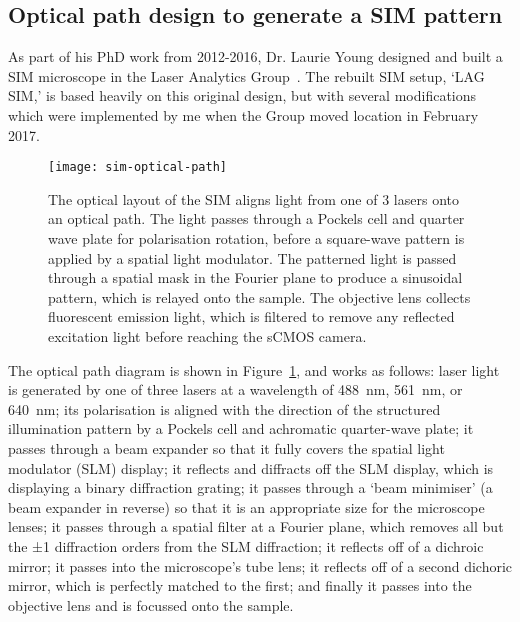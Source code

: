 \subsection{Optical path design to generate a SIM pattern} \label{sec:lagsim-path}
As part of his PhD work from 2012-2016, Dr. Laurie Young designed and built a SIM microscope in the Laser Analytics Group~\cite{young2016guide}. 
The rebuilt SIM setup, `LAG SIM,' is based heavily on this original design, but with several modifications which were implemented by me when the Group moved location in February 2017. 

\begin{figure}[p]
\centering
\texttt{[image: sim-optical-path]}
\caption[LAG SIM: Optics pattern laser light with a SIM pattern and apply polarisation rotation for optical sectioning and resolution enhancement]{The optical layout of the SIM aligns light from one of 3 lasers onto an optical path. The light passes through a Pockels cell and quarter wave plate for polarisation rotation, before a square-wave pattern is applied by a spatial light modulator. The patterned light is passed through a spatial mask in the Fourier plane to produce a sinusoidal pattern, which is relayed onto the sample. The objective lens collects fluorescent emission light,  which is filtered to remove any reflected excitation light before reaching the sCMOS camera.}
\label{fig:SIMpath}
\end{figure}

The optical path diagram is shown in Figure~\ref{fig:SIMpath}, and works as follows: laser light is generated by one of three lasers at a wavelength of \SI{488}{\nano\metre}, \SI{561}{\nano\metre}, or \SI{640}{\nano\metre}; its polarisation is aligned with the direction of the structured illumination pattern by a Pockels cell and achromatic quarter-wave plate; it passes through a beam expander so that it fully covers the spatial light modulator (SLM) display; it reflects and diffracts off the SLM display, which is displaying a binary diffraction grating; it passes through a `beam minimiser' (a beam expander in reverse) so that it is an appropriate size for the microscope lenses; it passes through a spatial filter at a Fourier plane, which removes all but the ±1 diffraction orders from the SLM diffraction; it reflects off of a dichroic mirror; it passes into the microscope's tube lens; it reflects off of a second dichoric mirror, which is perfectly matched to the first; and finally it passes into the objective lens and is focussed onto the sample. 

